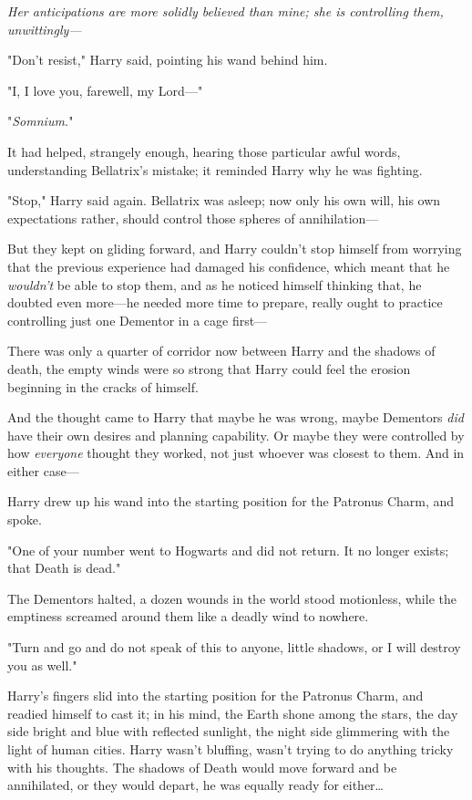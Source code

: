 \emph{Her anticipations are more solidly believed than mine; she is controlling
them, unwittingly---}

"Don't resist," Harry said, pointing his wand behind him.

"I, I love you, farewell, my Lord---"

"\emph{Somnium.}"

It had helped, strangely enough, hearing those particular awful words,
understanding Bellatrix's mistake; it reminded Harry why he was fighting.

"Stop," Harry said again. Bellatrix was asleep; now only his own will, his own
expectations rather, should control those spheres of annihilation---

But they kept on gliding forward, and Harry couldn't stop himself from worrying
that the previous experience had damaged his confidence, which meant that he
\emph{wouldn't} be able to stop them, and as he noticed himself thinking that,
he doubted even more---he needed more time to prepare, really ought to practice
controlling just one Dementor in a cage first---

There was only a quarter of corridor now between Harry and the shadows of
death, the empty winds were so strong that Harry could feel the erosion
beginning in the cracks of himself.

And the thought came to Harry that maybe he was wrong, maybe Dementors
\emph{did} have their own desires and planning capability. Or maybe they were
controlled by how \emph{everyone} thought they worked, not just whoever was
closest to them. And in either case---

Harry drew up his wand into the starting position for the Patronus Charm, and
spoke.

"One of your number went to Hogwarts and did not return. It no longer exists;
that Death is dead."

The Dementors halted, a dozen wounds in the world stood motionless, while the
emptiness screamed around them like a deadly wind to nowhere.

"Turn and go and do not speak of this to anyone, little shadows, or I will
destroy you as well."

Harry's fingers slid into the starting position for the Patronus Charm, and
readied himself to cast it; in his mind, the Earth shone among the stars, the
day side bright and blue with reflected sunlight, the night side glimmering
with the light of human cities. Harry wasn't bluffing, wasn't trying to do
anything tricky with his thoughts. The shadows of Death would move forward and
be annihilated, or they would depart, he was equally ready for either…

